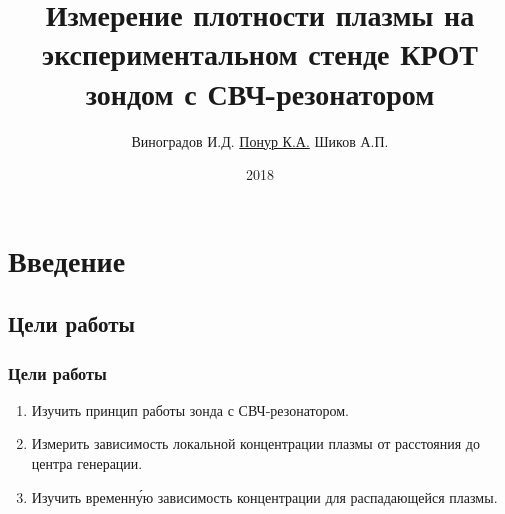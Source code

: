 \documentclass[10pt,pdf,hyperref={unicode}, dvipsnames]{beamer}
\begin{document}
\title[Измерение плотности плазмы]{Измерение плотности плазмы на  экспериментальном стенде КРОТ зондом с СВЧ-резонатором}

\author{%
	Виноградов И.Д. %
	\underline{Понур К.А.} %
	Шиков А.П. %
}


\date{2018}


\section{Введение}
\subsection{Цели работы}
\begin{frame}[t]
	\frametitle{Цели работы}
		\vfill
		\begin{enumerate}
			\item Изучить принцип работы зонда с СВЧ-резонатором.

			\item Измерить зависимость локальной концентрации плазмы			от расстояния до центра генерации.

			\item Изучить временн\'{у}ю зависимость концентрации для распадающейся плазмы.

		\end{enumerate}
		\vfill
\end{frame}
\end{document}
